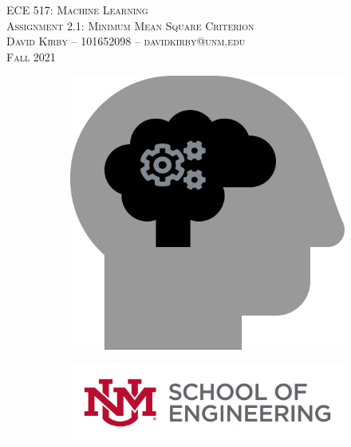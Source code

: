 \documentclass[11pt]{article}
\begin{document}
\setmainfont{SF Pro Text}
\setsansfont{SF Pro Text}
\setmonofont{SF Mono}
\renewcommand{\familydefault}{\sfdefault}


\thispagestyle{empty}
\begin{titlepage}
\vspace*{\fill}
\begin{center}
\textsc{\Huge{ECE 517: Machine Learning}}\\[3em]
\textsc{\LARGE Assignment 2.1: Minimum Mean Square Criterion}\\[6em]
\textsc{\Large David Kirby -- 101652098 -- davidkirby@unm.edu}\\[3em]
\textsc{\Large Fall 2021}
\end{center}
\vfill
\begin{figure}[h]
\begin{subfigure}{0.5\textwidth}
\includegraphics[width=0.25\linewidth]{learning.png}
\end{subfigure}
\begin{subfigure}{0.6\textwidth}\hspace{1em}
\includegraphics[width=0.8\linewidth]{new-soe-logo.png}
\end{subfigure}
\end{figure}
\end{titlepage}
\setcounter{figure}{0}



\hypersetup{
    linkcolor=CrispBlue,
    urlcolor=CrispBlue,
    breaklinks=true
}
\end{document}
